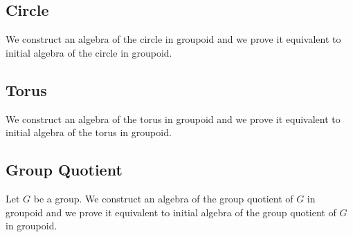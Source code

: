 \subsection{Circle}
\label{sec:circle_fund_group}

We construct an algebra of the circle in groupoid and we prove it
equivalent to initial algebra of the circle in groupoid.

\subsection{Torus}
\label{sec:torus_fund_group}

We construct an algebra of the torus in groupoid and we prove it
equivalent to initial algebra of the torus in groupoid.

\subsection{Group Quotient}
\label{sec:group_quotient_fund_group}

Let $G$ be a group.  We construct an algebra of the group quotient of $G$ in
groupoid and we prove it equivalent to initial algebra of the group
quotient of $G$ in groupoid.
